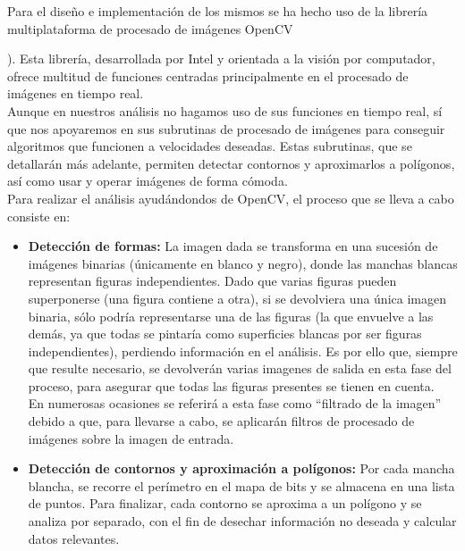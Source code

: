 Para el diseño e implementación de los mismos se ha hecho uso de la librería multiplataforma de procesado de imágenes OpenCV {\cite{opencvDoc}). Esta librería, desarrollada por Intel y orientada a la visión por computador, ofrece multitud de funciones centradas principalmente en el procesado de imágenes en tiempo real.\\

Aunque en nuestros análisis no hagamos uso de sus funciones en tiempo real, sí que nos apoyaremos en sus subrutinas de procesado de imágenes para conseguir algoritmos que funcionen a velocidades deseadas. Estas subrutinas, que se detallarán más adelante, permiten detectar contornos y aproximarlos a polígonos, así como usar y operar imágenes de forma cómoda.\\

Para realizar el análisis ayudándondos de OpenCV, el proceso que se lleva a cabo consiste en:

\begin{itemize}

	\item \textbf{Detección de formas:} La imagen dada se transforma en una sucesión de imágenes binarias (únicamente en blanco y negro), donde las manchas blancas representan figuras independientes. Dado que varias figuras pueden superponerse (una figura contiene a otra), si se devolviera una única imagen binaria, sólo podría representarse una de las figuras (la que envuelve a las demás, ya que todas se pintaría como superficies blancas por ser figuras independientes), perdiendo información en el análisis. Es por ello que, siempre que resulte necesario, se devolverán varias imagenes de salida en esta fase del proceso, para asegurar que todas las figuras presentes se tienen en cuenta.\\
	
	En numerosas ocasiones se referirá a esta fase como ``filtrado de la imagen'' debido a que, para llevarse a cabo, se aplicarán filtros de procesado de imágenes sobre la imagen de entrada.
	
	\item\textbf{Detección de contornos y aproximación a polígonos:} Por cada mancha blancha, se recorre el perímetro en el mapa de bits y se almacena en una lista de puntos. Para finalizar, cada contorno se aproxima a un polígono y se analiza por separado, con el fin de desechar información no deseada y calcular datos relevantes. 
	
\end{itemize}

}
